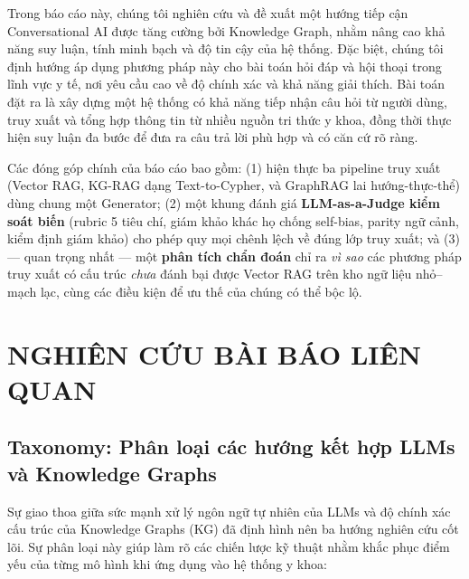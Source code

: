 \documentclass[conference]{IEEEtran}
\begin{document}
Trong báo cáo này, chúng tôi nghiên cứu và đề xuất một hướng tiếp cận Conversational AI được tăng cường bởi Knowledge Graph, nhằm nâng cao khả năng suy luận, tính minh bạch và độ tin cậy của hệ thống. Đặc biệt, chúng tôi định hướng áp dụng phương pháp này cho bài toán hỏi đáp và hội thoại trong lĩnh vực y tế, nơi yêu cầu cao về độ chính xác và khả năng giải thích. Bài toán đặt ra là xây dựng một hệ thống có khả năng tiếp nhận câu hỏi từ người dùng, truy xuất và tổng hợp thông tin từ nhiều nguồn tri thức y khoa, đồng thời thực hiện suy luận đa bước để đưa ra câu trả lời phù hợp và có căn cứ rõ ràng.

Các đóng góp chính của báo cáo bao gồm: (1) hiện thực ba pipeline truy xuất (Vector RAG, KG-RAG dạng Text-to-Cypher, và GraphRAG lai hướng-thực-thể) dùng chung một Generator; (2) một khung đánh giá \textbf{LLM-as-a-Judge kiểm soát biến} (rubric 5 tiêu chí, giám khảo khác họ chống self-bias, parity ngữ cảnh, kiểm định giám khảo) cho phép quy mọi chênh lệch về đúng lớp truy xuất; và (3) --- quan trọng nhất --- một \textbf{phân tích chẩn đoán} chỉ ra \emph{vì sao} các phương pháp truy xuất có cấu trúc \emph{chưa} đánh bại được Vector RAG trên kho ngữ liệu nhỏ--mạch lạc, cùng các điều kiện để ưu thế của chúng có thể bộc lộ.
 

\section{NGHIÊN CỨU BÀI BÁO LIÊN QUAN}
\subsection{Taxonomy: Phân loại các hướng kết hợp LLMs và Knowledge Graphs}

Sự giao thoa giữa sức mạnh xử lý ngôn ngữ tự nhiên của LLMs và độ chính xác cấu trúc của Knowledge Graphs (KG) đã định hình nên ba hướng nghiên cứu cốt lõi. Sự phân loại này giúp làm rõ các chiến lược kỹ thuật nhằm khắc phục điểm yếu của từng mô hình khi ứng dụng vào hệ thống y khoa:
\end{document}
